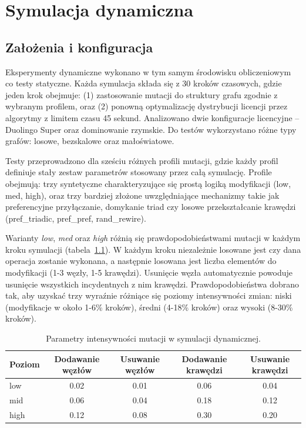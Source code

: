 \chapter{Symulacja dynamiczna}\label{chap:dynamic}

\section{Założenia i konfiguracja}

Eksperymenty dynamiczne wykonano w tym samym środowisku obliczeniowym co testy statyczne. Każda symulacja składa się z 30 kroków czasowych, gdzie jeden krok obejmuje: (1) zastosowanie mutacji do struktury grafu zgodnie z wybranym profilem, oraz (2) ponowną optymalizację dystrybucji licencji przez algorytmy z limitem czasu 45 sekund. Analizowano dwie konfiguracje licencyjne -- Duolingo Super oraz dominowanie rzymskie. Do testów wykorzystano różne typy grafów: losowe, bezskalowe oraz małoświatowe.

Testy przeprowadzono dla sześciu różnych profili mutacji, gdzie każdy profil definiuje stały zestaw parametrów stosowany przez całą symulację. Profile obejmują: trzy syntetyczne charakteryzujące się prostą logiką modyfikacji (low, med, high), oraz trzy bardziej złożone uwzględniające mechanizmy takie jak preferencyjne przyłączanie, domykanie triad czy losowe przekształcanie krawędzi (pref\_triadic, pref\_pref, rand\_rewire).

Warianty \emph{low}, \emph{med} oraz \emph{high} różnią się prawdopodobieństwami mutacji w każdym kroku symulacji (tabela~\ref{tab:dyn-mutation-levels}). W każdym kroku niezależnie losowane jest czy dana operacja zostanie wykonana, a następnie losowana jest liczba elementów do modyfikacji (1-3 węzły, 1-5 krawędzi). Usunięcie węzła automatycznie powoduje usunięcie wszystkich incydentnych z nim krawędzi. Prawdopodobieństwa dobrano tak, aby uzyskać trzy wyraźnie różniące się poziomy intensywności zmian: niski (modyfikacje w około 1-6\% kroków), średni (4-18\% kroków) oraz wysoki (8-30\% kroków).

\begin{table}[H]
  \centering
  \caption{Parametry intensywności mutacji w symulacji dynamicznej.}
  \label{tab:dyn-mutation-levels}
  \begin{tabular}{lcccc}
    \toprule
    \textbf{Poziom} & \textbf{Dodawanie węzłów} & \textbf{Usuwanie węzłów} & \textbf{Dodawanie krawędzi} & \textbf{Usuwanie krawędzi} \\
    \midrule
    low             & 0.02                      & 0.01                     & 0.06                        & 0.04                       \\
    mid             & 0.06                      & 0.04                     & 0.18                        & 0.12                       \\
    high            & 0.12                      & 0.08                     & 0.30                        & 0.20                       \\
  \end{tabular}
\end{table}


